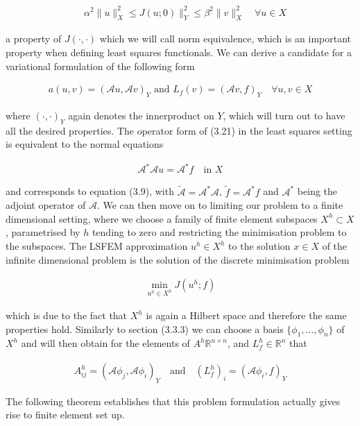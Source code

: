 \documentclass[../draft_1.tex]{subfiles}
\begin{document}
\begin{ceqn}
	\begin{align}
	\quad \alpha^2 \| u \|_X^2 \leq J(u; 0)  \|_Y^2 \leq \beta^2 \| v \|_X^2 \quad \forall u \in X
	\end{align} 
\end{ceqn}
a property of $J(\cdot, \cdot)$ which we will call norm equivalence, which is an important property when defining least squares functionals. We can derive a candidate for a variational formulation of the following form 
\begin{ceqn}
\begin{align}
a(u,v) = (\mathcal{A}u, \mathcal{A}v)_Y \text{ and } L_f(v) = (\mathcal{A}v, f)_Y \quad \forall u,v \in X
\end{align}
\end{ceqn}
where $(\cdot, \cdot)_Y$ again denotes the innerproduct on $Y$, which will turn out to have all the desired properties. The operator form of (3.21) in the least squares setting is equivalent to the normal equations
\begin{ceqn}
\begin{align}
\mathcal{A}^* \mathcal{A} u = \mathcal{A}^* f \quad \text{in } X
\end{align}
\end{ceqn}
and corresponds to equation (3.9), with $\tilde{\mathcal{A}} = \mathcal{A}^* \mathcal{A}$, $\tilde{f} = \mathcal{A}^* f $ and $\mathcal{A}^*$ being the adjoint operator of $\mathcal{A}$. We can then move on to limiting our problem to a finite dimensional setting, where we choose a family of finite element subspaces $X^h \subset X$, parametrised by $h$ tending to zero and restricting the minimisation problem to the subspaces. The LSFEM approximation $u^h \in X^h$ to the solution $x \in X$ of the infinite dimensional problem is the solution of the discrete minimisation problem 
\begin{ceqn}
\begin{align}
\min_{u^h \in X^h} J(u^h; f)
\end{align}
\end{ceqn}
which is due to the fact that $X^h$ is again a Hilbert space and therefore the same properties hold. Similarly to section (3.3.3) we can choose a basis $\{\phi_1, ..., \phi_n\}$ of $X^h$ and will then obtain for the elements of $A^h \mathbb{R}^{n \times n}$, and $L_f^h \in \mathbb{R}^n$ that

\begin{ceqn}
	\begin{align}
	A_{ij}^h = (\mathcal{A} \phi_j, \mathcal{A} \phi_i)_Y \quad \text{and} \quad (L_f^h)_i = (\mathcal{A} \phi_i, f)_Y
	\end{align}
\end{ceqn}
The following theorem establishes that this problem formulation actually gives rise to finite element set up. 
\end{document}
